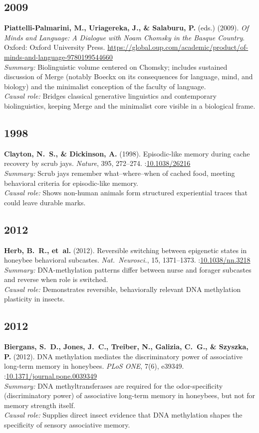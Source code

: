 \documentclass[11pt,a4paper]{article}
\begin{document}
\subsection*{2009}
\textbf{Piattelli-Palmarini, M., Uriagereka, J., \& Salaburu, P.} (eds.) (2009). \textit{Of Minds and Language: A Dialogue with Noam Chomsky in the Basque Country}. Oxford: Oxford University Press.  
\url{https://global.oup.com/academic/product/of-minds-and-language-9780199544660}\\
\textit{Summary:} Biolinguistic volume centered on Chomsky; includes sustained discussion of Merge (notably Boeckx on its consequences for language, mind, and biology) and the minimalist conception of the faculty of language.\\
\textit{Causal role:} Bridges classical generative linguistics and contemporary biolinguistics, keeping Merge and the minimalist core visible in a biological frame.

\subsection*{1998}
\textbf{Clayton, N.~S., \& Dickinson, A.} (1998). Episodic-like memory during cache recovery by scrub jays. \textit{Nature}, 395, 272--274.  
\doi:\url{10.1038/26216}\\
\textit{Summary:} Scrub jays remember what--where--when of cached food, meeting behavioral criteria for episodic-like memory.\\
\textit{Causal role:} Shows non-human animals form structured experiential traces that could leave durable marks.

\subsection*{2012}
\textbf{Herb, B.~R., et~al.} (2012). Reversible switching between epigenetic states in honeybee behavioral subcastes. \textit{Nat.\ Neurosci.}, 15, 1371--1373.  
\doi:\url{10.1038/nn.3218}\\
\textit{Summary:} DNA-methylation patterns differ between nurse and forager subcastes and reverse when role is switched.\\
\textit{Causal role:} Demonstrates reversible, behaviorally relevant DNA methylation plasticity in insects.

\subsection*{2012}
\textbf{Biergans, S.~D., Jones, J.~C., Treiber, N., Galizia, C.~G., \& Szyszka, P.} (2012). DNA methylation mediates the discriminatory power of associative long-term memory in honeybees. \textit{PLoS ONE}, 7(6), e39349.  
\doi:\url{10.1371/journal.pone.0039349}\\
\textit{Summary:} DNA methyltransferases are required for the odor-specificity (discriminatory power) of associative long-term memory in honeybees, but not for memory strength itself.\\
\textit{Causal role:} Supplies direct insect evidence that DNA methylation shapes the specificity of sensory associative memory.
\end{document}
